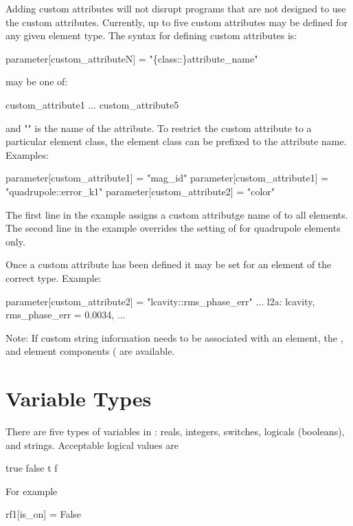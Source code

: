 {{Adding custom attributes will not disrupt programs that are not
designed to use the custom attributes. Currently, up to five custom
attributes may be defined for any given element type. The syntax for
defining custom attributes is:
\begin{example}
  parameter[custom_attributeN] = "\{class::\}attribute_name"
\end{example}
 may be one of:
\begin{example}
  custom_attribute1
  ...
  custom_attribute5
\end{example}
and "" is the name of the attribute. To restrict the
custom attribute to a particular element class, the element class
can be prefixed to the attribute name. Examples:
\begin{example}
  parameter[custom_attribute1] = "mag_id"
  parameter[custom_attribute1] = "quadrupole::error_k1"
  parameter[custom_attribute2] = "color"
\end{example}
The first line in the example assigns a custom attributge name of
 to all elements.  The second line in the example overrides
the setting of  for quadrupole elements only. 

Once a custom attribute has been defined it may be set for an element
of the correct type. Example:
\begin{example}
  parameter[custom_attribute2] = "lcavity::rms_phase_err"
  ...
  l2a: lcavity, rms_phase_err = 0.0034, ...
\end{example}

Note: If custom string information needs to be associated with an
element, the ,  and  element components
( are available.

\section{Variable Types}
\label{s:var.types}

There are five types of variables in \bmad: reals, integers, switches,
logicals (booleans), and strings. Acceptable logical values are
\begin{example}
   true    false
   t       f
\end{example}
For example
\begin{example}
  rf1[is_on] = False
\end{example}

}}
